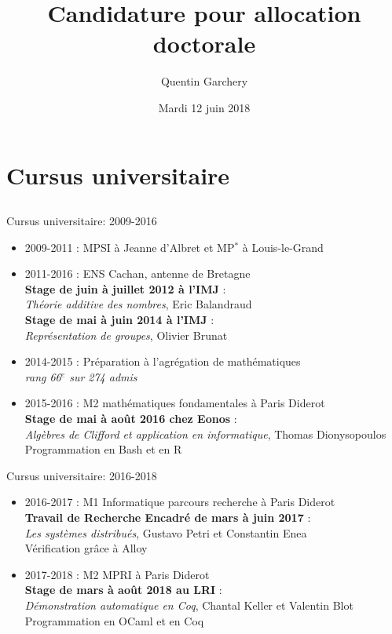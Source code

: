 \documentclass{beamer}
\title[Audition]{Candidature pour allocation doctorale}
\author{Quentin Garchery}
\date{Mardi 12 juin 2018}
\begin{document}
\begin{frame}
  \titlepage
\end{frame}


\section{Cursus universitaire}

\subsection{}

\begin{frame}{Cursus universitaire: 2009-2016}
\begin{itemize}
  \item 2009-2011 : MPSI à Jeanne d'Albret et MP$^*$  à Louis-le-Grand
  \item 2011-2016 : ENS Cachan, antenne de Bretagne\\
  \textbf{Stage de juin à juillet 2012 à l'IMJ} : \\
  \textit{Théorie additive des nombres}, Eric Balandraud \\
  \textbf{Stage de mai à juin 2014 à l'IMJ} : \\
  \textit{Représentation de groupes}, Olivier Brunat
  \item 2014-2015 : Préparation à l'agrégation de mathématiques \\
  \textit{rang 66$^e$ sur 274 admis}
  \item 2015-2016 : M2 mathématiques fondamentales à Paris Diderot \\
  \textbf{Stage de mai à août 2016 chez Eonos} : \\
  \textit{Algèbres de Clifford et application en informatique}, Thomas Dionysopoulos \\
  Programmation en Bash et en R
\end{itemize}
\end{frame}

\begin{frame}{Cursus universitaire: 2016-2018}
\begin{itemize}
  \item 2016-2017 : M1 Informatique parcours recherche à Paris Diderot\\
  \textbf{Travail de Recherche Encadré de mars à juin 2017} :\\
  \textit{Les systèmes distribués}, Gustavo Petri et Constantin Enea\\
  Vérification grâce à Alloy
  \vspace{5mm}
  \item 2017-2018 : M2 MPRI à Paris Diderot\\
  \textbf{Stage de mars à août 2018 au LRI} : \\
  \textit{Démonstration automatique en Coq}, Chantal Keller et Valentin Blot\\
  Programmation en OCaml et en Coq
\end{itemize}
\end{frame}
\end{document}
